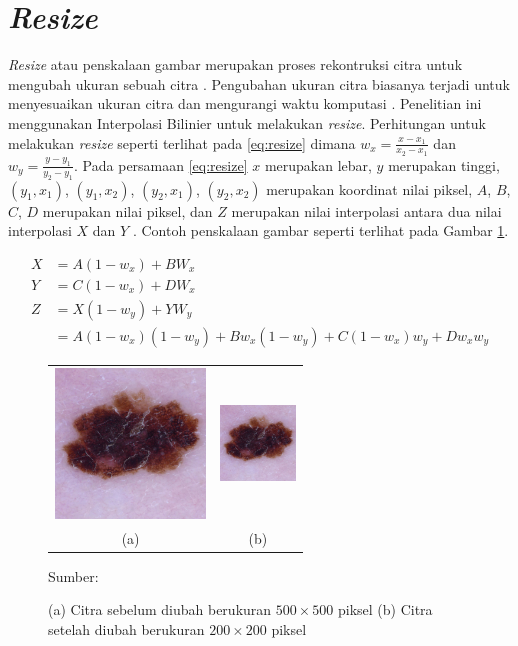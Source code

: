 \section{\textit{Resize}}
\textit{Resize} atau penskalaan gambar merupakan proses rekontruksi citra untuk mengubah ukuran sebuah citra \citep{Morsy2018}. Pengubahan ukuran citra biasanya terjadi untuk menyesuaikan ukuran citra dan mengurangi waktu komputasi \citep{AhmedThaajwer2020a,Umamaheswari2018}. Penelitian ini menggunakan Interpolasi Bilinier untuk melakukan \textit{resize}. Perhitungan untuk melakukan \textit{resize} seperti terlihat pada \ref{eq:resize} dimana $w_x = \frac{x-x_1}{x_2-x_1}$ dan $w_y = \frac{y-y_1}{y_2-y_1}$. Pada persamaan \ref{eq:resize} $x$ merupakan lebar, $y$ merupakan tinggi, $(y_1, x_1)$, $(y_1, x_2)$, $(y_2, x_1)$, $(y_2, x_2)$ merupakan koordinat nilai piksel, $A$, $B$, $C$, $D$ merupakan nilai piksel, dan $Z$ merupakan nilai interpolasi antara dua nilai interpolasi $X$ dan $Y$ \citep{Gribbon2004}. Contoh penskalaan gambar seperti terlihat pada Gambar \ref{fig:resize}.

\begin{align}
    X &= A(1-w_x)+BW_x\nonumber\\
    Y &= C(1-w_x)+DW_x\nonumber\\
    Z &= X(1-w_y)+YW_y\nonumber\\
    \label{eq:resize}
    &= A(1-w_x)(1-w_y) + Bw_x(1-w_y) + C(1-w_x)w_y + Dw_{x}w_{y}
\end{align}

\begin{figure}[H]
    \centering
    \begin{tabular}{cc}
        \includegraphics[width=4cm]{../img/Skin Cancer MEL - Latex.jpg}
        &
        \includegraphics[width=2cm]{../img/Skin Cancer MEL - Latex.jpg}\\
        (a) &(b)\\
    \end{tabular}
    \caption{(a) Citra sebelum diubah berukuran $500\times 500$ piksel (b) Citra setelah diubah berukuran $200\times 200$ piksel}
    \label{fig:resize}
    Sumber: \citep{Morsy2018}
\end{figure}

